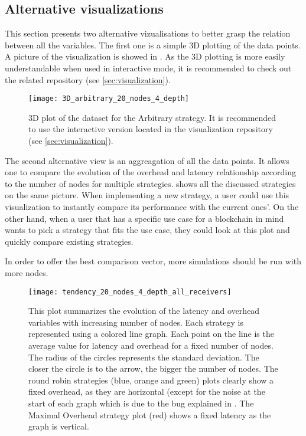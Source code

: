 \subsection{Alternative visualizations}
\label{ssec:summaryViz}

This section presents two alternative vizualisations to better grasp the
relation between all the variables. The first one is a simple 3D plotting of the
data points. A picture of the visualization is showed in . As the
3D plotting is more easily understandable when used in interactive mode, it is
recommended to check out the related repository (see \ref{sec:visualization}).

\begin{figure}[h]
    \centering
    \texttt{[image: 3D\_arbitrary\_20\_nodes\_4\_depth]}
    \caption{3D plot of the dataset for the Arbitrary strategy. It is
    recommended to use the interactive version located in the visualization
    repository (see \ref{sec:visualization}).}
    \label{fig:3Dplot}
\end{figure}

The second alternative view is an aggreagation of all the data points. It allows
one to compare the evolution of the overhead and latency relationship according
to the number of nodes for multiple strategies.  shows all
the discussed strategies on the same picture. When implementing a new strategy,
a user could use this visualization to instantly compare its performance with
the current ones'. On the other hand, when a user that has a specific use case
for a blockchain in mind wants to pick a strategy that fits the use case, they
could look at this plot and quickly compare existing strategies.

In order to offer the best comparison vector, more simulations should be run
with more nodes.

\begin{figure}[h]
    \centering
    \texttt{[image: tendency\_20\_nodes\_4\_depth\_all\_receivers]}
    \caption{This plot summarizes the evolution of the latency and overhead variables
    with increasing number of nodes. Each strategy is represented using a colored line
    graph. Each point on the line is the average value for latency and
    overhead for a fixed number of nodes. The radius of the circles represents
    the standard deviation. The closer the circle is to the arrow, the bigger
    the number of nodes. The round robin strategies (blue, orange and green) 
    plots clearly show a fixed overhead, as they are horizontal (except
    for the noise at the start of each graph which is due to the bug explained
    in . The Maximal Overhead strategy plot (red) shows a
    fixed latency as the graph is vertical.}
    \label{fig:commonViz}
\end{figure}

